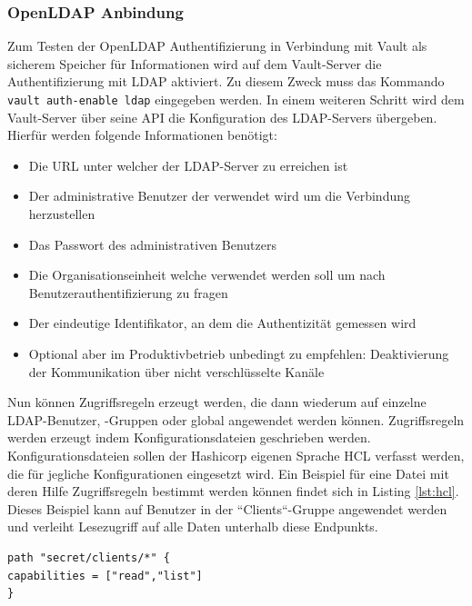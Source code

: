 \documentclass[
book,
a4paper,   
titlepage,  
halfparskip,
12pt        
]{scrartcl}
\newcommand\inline{\lstinline[basicstyle=\ttfamily]}
\begin{document}
\begin{onehalfspacing}
\subsubsection{OpenLDAP Anbindung}
Zum Testen der OpenLDAP Authentifizierung in Verbindung mit Vault als sicherem Speicher für Informationen wird auf dem Vault-Server die Authentifizierung mit \ac{LDAP} aktiviert. Zu diesem Zweck muss das Kommando \inline|vault auth-enable ldap| eingegeben werden. In einem weiteren Schritt wird dem Vault-Server über seine \ac{API} die Konfiguration des LDAP-Servers übergeben. Hierfür werden folgende Informationen benötigt\cite{vaultapi}:
\begin{itemize}
	\item Die \ac{URL} unter welcher der LDAP-Server zu erreichen ist
	\item Der administrative Benutzer der verwendet wird um die Verbindung herzustellen
	\item Das Passwort des administrativen Benutzers
	\item Die Organisationseinheit welche verwendet werden soll um nach Benutzerauthentifizierung zu fragen
	\item Der eindeutige Identifikator, an dem die Authentizität gemessen wird
	\item Optional aber im Produktivbetrieb unbedingt zu empfehlen: Deaktivierung der Kommunikation über nicht verschlüsselte Kanäle 
\end{itemize} 
Nun können Zugriffsregeln erzeugt werden, die dann wiederum auf einzelne \ac{LDAP}-Benutzer, -Gruppen oder global angewendet werden können. Zugriffsregeln werden erzeugt indem Konfigurationsdateien geschrieben werden.\\
Konfigurationsdateien sollen der Hashicorp eigenen Sprache \ac{HCL} verfasst werden, die für jegliche Konfigurationen eingesetzt wird. Ein Beispiel für eine Datei mit deren Hilfe Zugriffsregeln bestimmt werden können findet sich in Listing \vref{lst:hcl}. Dieses Beispiel kann auf Benutzer in der ``Clients``-Gruppe angewendet werden und verleiht Lesezugriff auf alle Daten unterhalb diese Endpunkts.\cite{vaultldap}

\begin{lstlisting}[caption={[Beispiel \acs{HCL}] Beispiel für eine Konfigurationsdatei im \ac{HCL}-Format\cite{vaultpol}}, label=lst:hcl, captionpos=b, basicstyle=\ttfamily] 
path "secret/clients/*" {
capabilities = ["read","list"]
}
\end{lstlisting}


\end{onehalfspacing}
\end{document}
